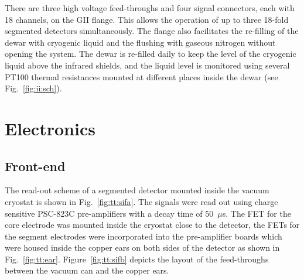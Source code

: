 There are three high voltage feed-throughs and four signal connectors,
each with 18 channels, on the GII flange. This allows the operation of
up to three 18-fold segmented detectors simultaneously. The flange
also facilitates the re-filling of the dewar with cryogenic liquid and
the flushing with gaseous nitrogen without opening the system. The
dewar is re-filled daily to keep the level of the cryogenic liquid
above the infrared shields, and the liquid level is monitored using
several PT100 thermal resistances mounted at different places inside
the dewar (see Fig.~\ref{fig:ii:sch}).


\section{Electronics} 
\label{sec:tt:ele} 

\subsection{Front-end}
\label{sec:tt:fend} 
The read-out scheme of a segmented detector mounted inside the vacuum
cryostat is shown in Fig.~\ref{fig:tt:sifa}. The signals were read out
using charge sensitive PSC-823C pre-amplifiers with a decay time of
50~$\mu$s. The FET for the core electrode was mounted inside the
cryostat close to the detector, the FETs for the segment electrodes
were incorporated into the pre-amplifier boards which were housed
inside the copper ears on both sides of the detector as shown in
Fig.~\ref{fig:tt:ear}. Figure~\ref{fig:tt:sifb} depicts the layout of
the feed-throughs between the vacuum can and the copper ears.

